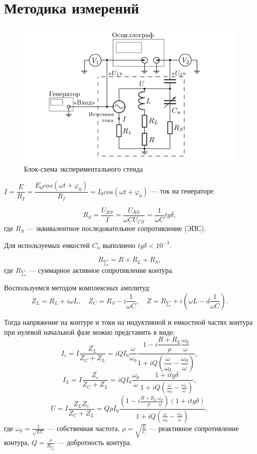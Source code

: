 \documentclass[a4paper, 12pt]{article}
\begin{document}
\section{Методика измерений}

\begin{figure}[h!]
\begin{center}
    \includegraphics[scale=2.5]{ust.png}
\end{center}
\caption{Блок-схема экспериментального стенда}
\label{ust}
\end{figure}

$I=\dfrac{E}{R_I}=\dfrac{E_0cos(\omega t+\varphi_0)}{R_I}=I_0cos(\omega t+\varphi_0)$ --- ток на генераторе.

\begin{equation}\label{eq:Rs}
R_S=\dfrac{U_{RS}}{I}=\frac{U_{RS}}{\omega CU_{CS}}=\dfrac{1}{\omega C}tg\delta,
\end{equation}
где $R_S$ --- эквивалентное последовательное сопротивление (ЭПС).

Для используемых емкостей $C_n$ выполнено $tg\delta<10^{-3}$.

\begin{equation}\label{eq:Rsum}
R_{\sum}=R+R_L+R_S,
\end{equation}
где $R_{\sum}$ --- суммарное активное сопротивление контура.

Воспользуемся методом комплексных амплитуд:
$$Z_L=R_L+i\omega L, \quad Z_C=R_S-i\frac{1}{\omega C}, \quad Z=R_{\sum}+i(\omega L-d\dfrac{1}{\omega C}).$$

Тогда напряжение на контуре и токи на индуктивной и емкостной частях контура при нулевой начальной фазе можно представить в виде:
$$I_c=I\dfrac{Z_L}{Z_C+Z_L}=iQI_0\dfrac{\omega}{\omega_0}\dfrac{1-i\dfrac{R+R_L}{\rho}\dfrac{\omega_0}{\omega}}{1+iQ(\dfrac{\omega}{\omega_0}-\dfrac{\omega_0}{\omega})},$$
$$I_L=I\dfrac{Z_c}{Z_C+Z_L}=iQI_0\frac{\omega_0}{\omega}\frac{1+itg\delta}{1+iQ(\frac{\omega}{\omega_0}-\frac{\omega_0}{\omega})},$$
$$U=I\frac{Z_LZ_c}{Z_C+Z_L}=Q\rho I_0\frac{(1-i\frac{R+R_L}{\rho}\frac{\omega_0}{\omega})(1+itg\delta)}{1+iQ(\frac{\omega}{\omega_0}-\frac{\omega_0}{\omega})},$$
где $\omega_0=\frac{1}{\sqrt{LC}}$ --- собственная частота, $\rho=\sqrt{\frac{L}{C}}$ --- реактивное сопротивление контура, $Q=\frac{\rho}{R_{\sum}}$ --- добротность контура.
\end{document}
